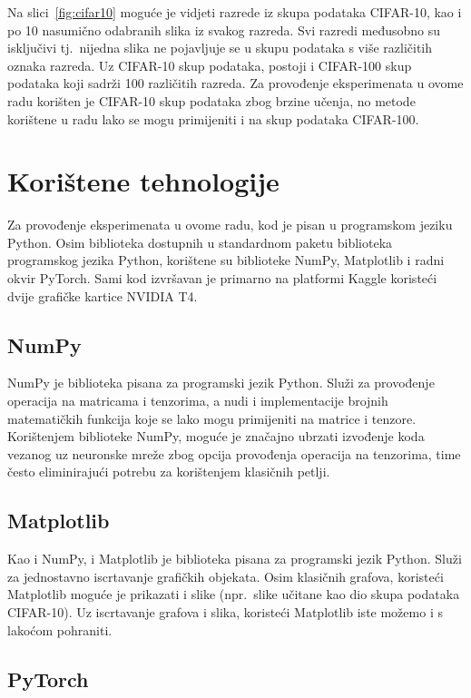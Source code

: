 \documentclass[times, utf8, zavrsni, numeric]{fer}
\begin{document}
Na slici~\ref{fig:cifar10} moguće je vidjeti razrede iz skupa podataka CIFAR-10, kao i po 10 nasumično odabranih slika iz svakog razreda.
Svi razredi međusobno su isključivi tj.\ nijedna slika ne pojavljuje se u skupu podataka s više različitih oznaka razreda. 
Uz CIFAR-10 skup podataka, postoji i CIFAR-100 skup podataka koji sadrži 100 različitih razreda. 
Za provođenje eksperimenata u ovome radu korišten je CIFAR-10 skup podataka zbog brzine učenja, no metode korištene u radu lako se mogu primijeniti i na skup podataka CIFAR-100.

\section{Korištene tehnologije}

Za provođenje eksperimenata u ovome radu, kod je pisan u programskom jeziku Python. Osim biblioteka dostupnih u standardnom paketu biblioteka programskog jezika Python,
korištene su biblioteke NumPy, Matplotlib i radni okvir PyTorch. Sami kod izvršavan je primarno na platformi Kaggle koristeći dvije grafičke kartice NVIDIA T4.

\subsection{NumPy}

NumPy je biblioteka pisana za programski jezik Python. 
Služi za provođenje operacija na matricama i tenzorima, a nudi i implementacije brojnih matematičkih funkcija koje se lako mogu primijeniti na matrice i tenzore.
Korištenjem biblioteke NumPy, moguće je značajno ubrzati izvođenje koda vezanog uz neuronske mreže zbog opcija provođenja operacija na tenzorima, time često eliminirajući potrebu za korištenjem klasičnih petlji.

\subsection{Matplotlib}

Kao i NumPy, i Matplotlib je biblioteka pisana za programski jezik Python.
Služi za jednostavno iscrtavanje grafičkih objekata. 
Osim klasičnih grafova, koristeći Matplotlib moguće je prikazati i slike (npr.\ slike učitane kao dio skupa podataka CIFAR-10).
Uz iscrtavanje grafova i slika, koristeći Matplotlib iste možemo i s lakoćom pohraniti.

\subsection{PyTorch}
\end{document}
